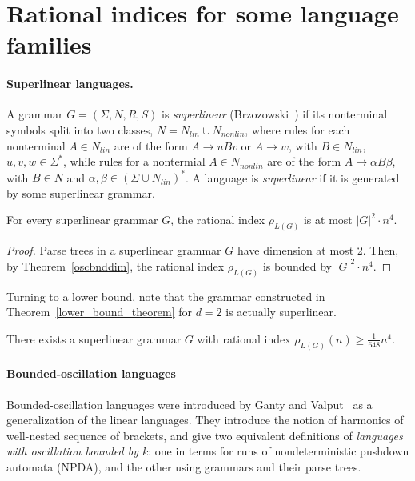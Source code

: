 \documentclass[runningheads]{llncs}
\begin{document}
\section{Rational indices for some language families}

\paragraph{Superlinear languages.}
A grammar $G = (\Sigma, N, R, S)$ is \textit{superlinear} (Brzozowski~\cite{superlinear})
if its nonterminal symbols split into two classes, $N = N_{lin} \cup N_{nonlin}$,
where rules for each nonterminal $A \in N_{lin}$
are of the form $A \to uBv$ or $A \to w$, with $B \in N_{lin}$, $u,v,w \in \Sigma^*$,
while rules for a nontermial $A \in N_{nonlin}$
are of the form $A \to \alpha B \beta$, with $B \in N$ and $\alpha,\beta \in (\Sigma \cup N_{lin})^*$.
A language is \textit{superlinear} if it is generated by some superlinear grammar. 

\begin{corollary}
For every superlinear grammar $G$,
the rational index $\rho_{L(G)}$ is at most $|G|^2 \cdot n^4$.
\end{corollary}
\begin{proof}
Parse trees in a superlinear grammar $G$ have dimension at most 2.
Then, by Theorem~\ref{oscbnddim},
the rational index $\rho_{L(G)}$ is bounded by $|G|^2 \cdot n^4$.
\end{proof}

Turning to a lower bound, note that the grammar
constructed in Theorem~\ref{lower_bound_theorem} for $d=2$
is actually superlinear.

\begin{corollary}
There exists a superlinear grammar $G$
with rational index $\rho_{L(G)}(n) \geqslant \frac{1}{648} n^4$.
\end{corollary}







\paragraph{Bounded-oscillation languages}
Bounded-oscillation languages were introduced by Ganty and Valput~\cite{BoundOsc}
as a generalization of the linear languages.
They introduce the notion of harmonics of well-nested sequence of brackets,
and give two equivalent definitions
of \emph{languages with oscillation bounded by $k$}:
one in terms for runs of nondeterministic pushdown automata (NPDA),
and the other using grammars and their parse trees.
\end{document}
